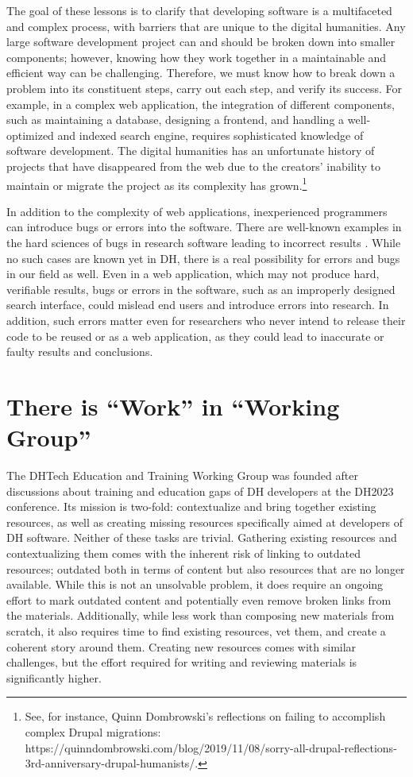 \documentclass[final]{anthology-ch} %
\begin{document}
The goal of these lessons is to clarify that developing software is a multifaceted and complex process, with barriers that are unique to the digital humanities.  Any large software development project can and should be broken down into smaller components; however, knowing how they work together in a maintainable and efficient way can be challenging. Therefore, we must know how to break down a problem into its constituent steps, carry out each step, and verify its success. For example, in a complex web application, the integration of different components, such as maintaining a database, designing a frontend, and handling a well-optimized and indexed search engine, requires sophisticated knowledge of software development. The digital humanities has an unfortunate history of projects that have disappeared from the web due to the creators’ inability to maintain or migrate the project as its complexity has grown.\footnote{See, for instance, Quinn Dombrowski’s reflections on failing to accomplish complex Drupal migrations: https://quinndombrowski.com/blog/2019/11/08/sorry-all-drupal-reflections-3rd-anniversary-drupal-humanists/.
}

In addition to the complexity of web applications, inexperienced programmers can introduce bugs or errors into the software. There are well-known examples in the hard sciences of bugs in research software leading to incorrect results \cite{neupane2019}. While no such cases are known yet in DH, there is a real possibility for errors and bugs in our field as well. Even in a web application, which may not produce hard, verifiable results, bugs or errors in the software, such as an improperly designed search interface, could mislead end users and introduce errors into research. In addition, such errors matter even for researchers who never intend to release their code to be reused or as a web application, as they could lead to inaccurate or faulty results and conclusions.


\section{There is “Work” in “Working Group”}

The DHTech Education and Training Working Group was founded after discussions about training and education gaps of DH developers at the DH2023 conference. Its mission is two-fold: contextualize and bring together existing resources, as well as creating missing resources specifically aimed at developers of DH software. Neither of these tasks are trivial. Gathering existing resources and contextualizing them comes with the inherent risk of linking to outdated resources; outdated both in terms of content but also resources that are no longer available. While this is not an unsolvable problem, it does require an ongoing effort to mark outdated content and potentially even remove broken links from the materials. Additionally, while less work than composing new materials from scratch, it also requires time to find existing resources, vet them, and create a coherent story around them. Creating new resources comes with similar challenges, but the effort required for writing and reviewing materials is significantly higher.
\end{document}
